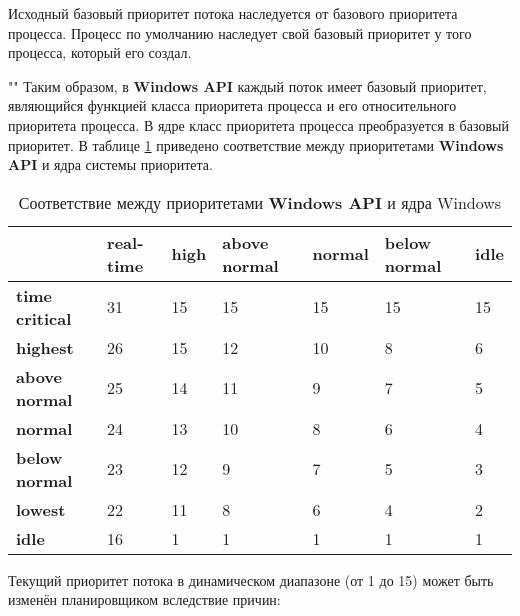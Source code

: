 \noindent Исходный базовый приоритет потока наследуется от базового приоритета процесса. Процесс по умолчанию наследует свой базовый приоритет у того процесса, который его создал. 

""\newline
\noindent Таким образом, в \textbf{Windows API} каждый поток имеет базовый приоритет, являю­щийся функцией класса приоритета процесса и его относительного приоритета процесса. В  ядре класс приоритета процесса преобразуется в базовый приоритет. В таблице \ref{tbl:priority} приведено соответствие между приоритетами \textbf{Windows API} и ядра системы приоритета.

\begin{table}[h]
    \caption{Соответствие между приоритетами \textbf{Windows API} и ядра Windows}
    \begin{center}
        \begin{tabular}{|l|p{45pt}|p{45pt}|p{45pt}|p{45pt}|p{45pt}|p{45pt}|}
            \hline
            {} & \textbf{real-time} & \textbf{high} & \textbf{above normal} & \textbf{normal} & \textbf{below normal} & \textbf{idle}\\
            \hline
            \textbf{time critical} & 31 & 15 & 15 & 15 & 15 & 15 \\
            \hline
            \textbf{highest} & 26 & 15 & 12 & 10 & 8 & 6 \\
            \hline
            \textbf{above normal} & 25 & 14 & 11 & 9 & 7 & 5 \\
            \hline
            \textbf{normal} & 24 & 13 & 10 & 8 & 6 & 4 \\
            \hline
            \textbf{below normal} & 23 & 12 & 9 & 7 & 5 & 3 \\
            \hline
            \textbf{lowest} & 22 & 11 & 8 & 6 & 4 & 2 \\
            \hline
            \textbf{idle} & 16 & 1 & 1 & 1 & 1 & 1 \\
            \hline
        \end{tabular}
    \end{center}
    \label{tbl:priority}
\end{table}


\noindent Текущий приоритет потока в динамическом диапазоне (от 1 до 15) может быть изменён планировщиком вследствие причин:

